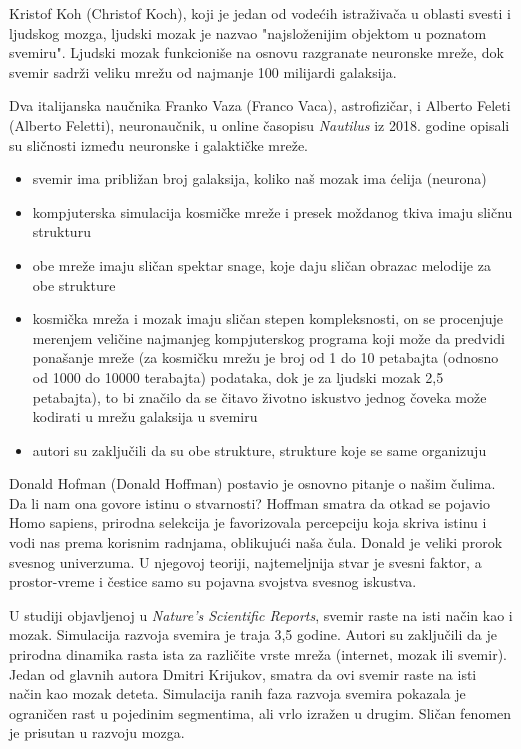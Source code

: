 \documentclass[a4paper]{article}
\begin{document}
Kristof Koh (Christof Koch), koji je jedan od vodećih istraživača u oblasti svesti i ljudskog mozga, ljudski mozak je nazvao "najsloženijim objektom u poznatom svemiru". Ljudski mozak funkcioniše na osnovu razgranate neuronske mreže, dok svemir sadrži veliku mrežu od najmanje 100 milijardi galaksija. 

Dva italijanska naučnika Franko Vaza (Franco Vaca), astrofizičar, i Alberto Feleti (Alberto Feletti), neuronaučnik, u online časopisu \textit{Nautilus} iz 2018. godine opisali su sličnosti između neuronske i galaktičke mreže. 
\begin{itemize}
  \item svemir ima približan broj galaksija, koliko naš mozak ima ćelija (neurona) 
  \item kompjuterska simulacija kosmičke mreže i presek moždanog tkiva imaju sličnu strukturu 
  \item obe mreže imaju sličan spektar snage, koje daju sličan obrazac melodije za obe strukture 
  \item kosmička mreža i mozak imaju sličan stepen kompleksnosti, on se procenjuje merenjem veličine najmanjeg kompjuterskog programa koji može da predvidi ponašanje mreže (za kosmičku mrežu je broj od 1 do 10 petabajta (odnosno od 1000 do 10000 terabajta) podataka, dok je za ljudski mozak 2,5 petabajta), to bi značilo da se čitavo životno iskustvo jednog čoveka može kodirati u mrežu galaksija u svemiru
  \item autori su zaključili da su obe strukture, strukture koje se same organizuju
\end{itemize}

Donald Hofman (Donald Hoffman) postavio je osnovno pitanje o našim čulima. Da li nam ona govore istinu o stvarnosti? Hoffman smatra da otkad se pojavio Homo sapiens, prirodna selekcija je favorizovala percepciju koja skriva istinu i vodi nas prema korisnim radnjama, oblikujući naša čula. Donald je veliki prorok svesnog univerzuma. U njegovoj teoriji, najtemeljnija stvar je svesni faktor, a prostor-vreme i čestice samo su pojavna svojstva svesnog iskustva. 

U studiji objavljenoj u \textit{Nature’s Scientific Reports}, svemir raste na isti način kao i mozak. Simulacija razvoja svemira je traja 3,5 godine. Autori su zaključili da je prirodna dinamika rasta ista za različite vrste mreža (internet, mozak ili svemir). Jedan od glavnih autora Dmitri Krijukov, smatra da ovi svemir raste na isti način kao mozak deteta. Simulacija ranih faza razvoja svemira pokazala je ograničen rast u pojedinim segmentima, ali vrlo izražen u drugim. Sličan fenomen je prisutan u razvoju mozga. 
\end{document}
